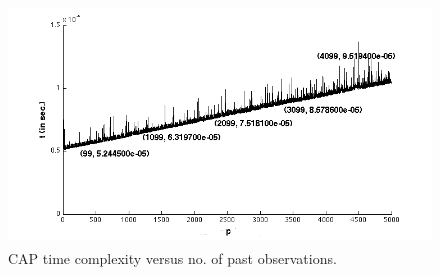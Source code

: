 \documentclass[prodmode,acmtaco,pdftex]{acmsmall}
\begin{document}
\hspace{0.3cm}
\begin{figure}
    \centering
    \includegraphics[width=1.0\linewidth,height=2.5in]{complexity_p}
    \caption{CAP time complexity versus no. of past observations.}
    \label{fig:complexityp}
\end{figure}
\end{document}

